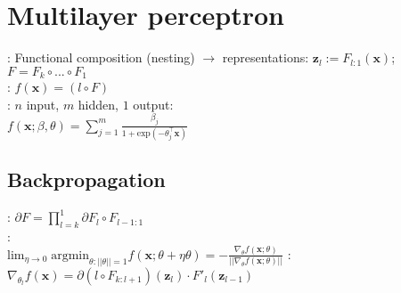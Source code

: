 \section{Multilayer perceptron}
: Functional composition (nesting) $\rightarrow$ representations: $\mathbf{z}_l := F_{l:1}(\mathbf{x})$; $F = F_k \circ ... \circ F_1$\\
: $f(\mathbf{x}) = (l \circ F)$\\
: $n$ input, $m$ hidden, $1$ output:\\
$f(\mathbf{x}; \beta, \theta) = \sum_{j=1}^m \frac{\beta_j}{1 + \text{exp}(-\theta_j^{\top} \mathbf{x})}$
\subsection*{Backpropagation}
: $\partial F = \prod_{l=k}^1 \partial F_l \circ F_{l-1:1}$ \\
: \\
$\text{lim}_{\eta \rightarrow 0} \; \text{argmin}_{\theta:||\theta||=1} f(\mathbf{x}; \theta + \eta \theta) = - \frac{\nabla_{\theta}f(\mathbf{x}; \theta)}{||\nabla_{\theta}f(\mathbf{x}; \theta)||}$
: $\nabla_{\theta_l}f(\mathbf{x}) = \partial (l \circ F_{k:l+1})(\mathbf{z}_l) \cdot F'_l(\mathbf{z}_{l-1})$


